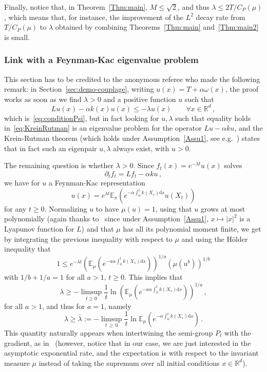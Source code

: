 \documentclass[AHL,Unicode,longabstracts,published]{cedram}
\newcommand{\R}{\mathbb R}
\newcommand{\bbE}{\mathbb E}
\newcommand{\dd}{\mathrm{d}}
\newcommand{\1}{\mathbbm{1}}
\newcommand{\nv}[1]{#1}
\let\oldforall\forall
\renewcommand*{\forall}{\mathrel{\oldforall}}
\newcommand{\R}{\mathbb R}
\begin{document}
Finally, notice that, in Theorem~\ref{Thm:main}, $M\leqslant \sqrt{2}$, and thus $\lambda\leqslant 2 T/C_P(\mu)$, which means that, for instance, the improvement of the $L^2$ decay rate from $T/C_P(\mu)$ to $\lambda$ obtained by \nv{combining} Theorems~\ref{Thm:main} and~\ref{Thm:main2} is small.

\subsubsection*{Link with a Feynman-Kac eigenvalue problem} 

This section has to be credited to the anonymous referee who made the following remark: in Section~\ref{sec:demo-couplage}, writing $u(x) = T+\alpha \omega(x)$, the proof works as soon as we find $\lambda>0$ and a positive function $u$ such that
\begin{equation}\label{eq:KreinRutman}
Lu(x) - \alpha k(x) u(x) \leqslant - \lambda u(x)\qquad \forall x\in\R^d\,,
\end{equation}
which is~\eqref{eq:conditionPsi}, but in fact looking for $u,\lambda$ such that equality holds in~\eqref{eq:KreinRutman} is an eigenvalue problem for the operator $Lu-\alpha ku$, and the Krein-Rutman theorem (which holds under Assumption~\ref{Assu1}, see e.g.~\cite[Corollary~4.2]{champagnat2023general}) states that in fact such an eigenpair $u,\lambda$ always exist, with $u>0$.

The remaining question is whether $\lambda >0$. Since $f_t(x) = e^{-\lambda t} u(x)$ solves
\[
\partial_t f_t = Lf_t - \alpha k u\,,
\]
we have for $u$ a Feynman-Kac representation
\[
u(x) = e^{\lambda t} \bbE_x \left( e^{-\alpha \int_0^t k(X_s)\dd s} u(X_t) \right)
\]
for any $t\geqslant 0$. Normalizing $u$ to have $\mu(u) = 1$, using that $u$ grows at most polynomially (again thanks to~\cite[Corollary~4.2]{champagnat2023general} since under Assumption~\ref{Assu1}, $x\mapsto |x|^2$ is a Lyapunov function for $L$) and that $\mu$ has all its polynomial moment finite, we get by integrating the previous inequality with respect to $\mu$ and using the Hölder inequality that
\[
1 \leqslant e^{-\lambda t} \left( \bbE_{\mu} \left( e^{- a \alpha \int_0^t k(X_s)\dd s} \right)\right)^{1/a} \left( \mu(u^{b})\right)^{1/b}
\]
with $1/b+1/a=1$ for all $a>1$, $t\geqslant 0$. This implies that
\[
\lambda \geqslant - \limsup_{t\geqslant 0} \frac{1}{t}\ln \left( \bbE_{\mu} \left( e^{- a\alpha \int_0^t k(X_s)\dd s} \right)\right)^{1/a}\,,
\]
for all $a>1$, and thus for $a=1$, namely
\[
\lambda \geqslant \bar\lambda := - \limsup_{t\,\geqslant\,0} \frac{1}{t}\ln \bbE_{\mu} \left( e^{- \alpha \int_0^t k(X_s)\dd s} \right)\,.
\]
This quantity naturally appears when intertwining the semi-group $P_t$ with the gradient, as in~\cite{arnaudon2018intertwinings,CattiauxGuillinFathi,10.3150/12-BEJ433} (however, notice that in our case, we are just interested in the asymptotic exponential rate, and the expectation is with respect to the invariant measure $\mu$ instead of taking the supremum over all initial conditions $x\in\R^d$).
\end{document}
